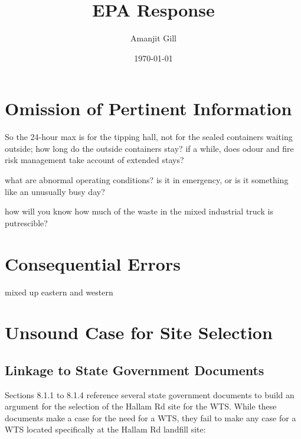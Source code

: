 \documentclass{article}
\title{EPA Response}
\author{\large Amanjit Gill}
\date{\small \today}
\begin{document}
\maketitle

\section{Omission of Pertinent Information}

So the 24-hour max is for the tipping hall, not for the sealed containers waiting outside; how long do the outside containers stay? if a while, does odour and fire risk management take account of extended stays?

what are abnormal operating conditions? is it in emergency, or is it something like an unusually busy day?

how will you know how much of the waste in the mixed industrial truck is putrescible?

\section{Consequential Errors}

mixed up eastern and western

\section{Unsound Case for Site Selection}

\subsection{Linkage to State Government Documents}

Sections 8.1.1 to 8.1.4 reference several state government documents to build an argument for the selection of the Hallam Rd site for the WTS. While these documents make a case for the need for a WTS, they fail to make any case for a WTS located specifically at the Hallam Rd landfill site:
\end{document}
